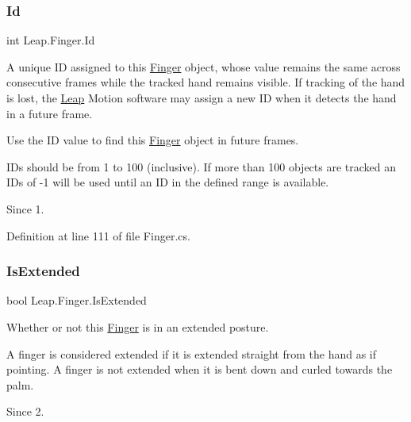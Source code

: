 \mbox{\label{class_leap_1_1_finger_a84df992a5e1b895acdc3b4c3da000950}} 
\subsubsection{\texorpdfstring{Id}{Id}}
{\footnotesize\ttfamily int Leap.\+Finger.\+Id}



A unique ID assigned to this \mbox{\hyperlink{class_leap_1_1_finger}{Finger}} object, whose value remains the same across consecutive frames while the tracked hand remains visible. If tracking of the hand is lost, the \mbox{\hyperlink{namespace_leap}{Leap}} Motion software may assign a new ID when it detects the hand in a future frame. 

Use the ID value to find this \mbox{\hyperlink{class_leap_1_1_finger}{Finger}} object in future frames.

I\+Ds should be from 1 to 100 (inclusive). If more than 100 objects are tracked an I\+Ds of -\/1 will be used until an ID in the defined range is available.

\begin{DoxySince}{Since}
1. 
\end{DoxySince}


Definition at line 111 of file Finger.\+cs.

\mbox{\label{class_leap_1_1_finger_a31c324f6e2a928fbd516164a6c5bcd7d}} 
\subsubsection{\texorpdfstring{IsExtended}{IsExtended}}
{\footnotesize\ttfamily bool Leap.\+Finger.\+Is\+Extended}



Whether or not this \mbox{\hyperlink{class_leap_1_1_finger}{Finger}} is in an extended posture. 

A finger is considered extended if it is extended straight from the hand as if pointing. A finger is not extended when it is bent down and curled towards the palm.

\begin{DoxySince}{Since}
2. 
\end{DoxySince}


